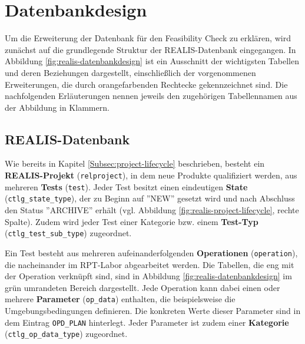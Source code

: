 \section{Datenbankdesign}
Um die Erweiterung der Datenbank für den Feasibility Check zu erklären, wird zunächst auf die grundlegende Struktur der REALIS-Datenbank eingegangen. In Abbildung \ref{fig:realis-datenbankdesign} ist ein Ausschnitt der wichtigsten Tabellen und deren Beziehungen dargestellt, einschließlich der vorgenommenen Erweiterungen, die durch orangefarbenden Rechtecke gekennzeichnet sind. Die nachfolgenden Erläuterungen nennen jeweils den zugehörigen Tabellennamen aus der Abbildung in Klammern.

\subsection{REALIS-Datenbank}

Wie bereits in Kapitel \ref{Subsec:project-lifecycle} beschrieben, besteht ein \textbf{REALIS-Projekt} (\texttt{relproject}), in dem neue Produkte qualifiziert werden, aus mehreren \textbf{Tests} (\texttt{test}). Jeder Test besitzt einen eindeutigen \textbf{State} (\texttt{ctlg\_state\_type}), der zu Beginn auf ''NEW'' gesetzt wird und nach Abschluss den Status ''ARCHIVE'' erhält (vgl. Abbildung \ref{fig:realis-project-lifecycle}, rechte Spalte). Zudem wird jeder Test einer Kategorie bzw. einem \textbf{Test-Typ} (\texttt{ctlg\_test\-\_sub\_type}) zugeordnet.

Ein Test besteht aus mehreren aufeinanderfolgenden \textbf{Operationen} (\texttt{operation}), die nacheinander im \gls{RPT}-Labor abgearbeitet werden. Die Tabellen, die eng mit der Operation verknüpft sind, sind in Abbildung \ref{fig:realis-datenbankdesign} im grün umrandeten Bereich dargestellt. Jede Operation kann dabei einen oder mehrere \textbf{Parameter} (\texttt{op\_data}) enthalten, die beispielsweise die Umgebungsbedingungen definieren. Die konkreten Werte dieser Parameter sind in dem Eintrag \texttt{OPD\_PLAN} hinterlegt. Jeder Parameter ist zudem einer \textbf{Kategorie} (\texttt{ctlg\_op\_\-data\_type}) zugeordnet.  


